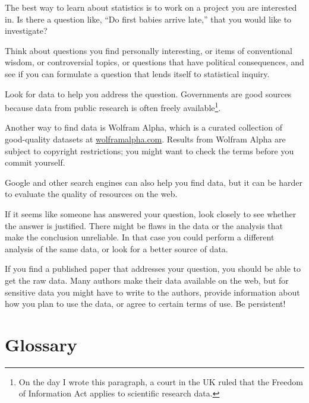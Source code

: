 \documentclass[12pt]{book}
\begin{document}
\begin{exercise}
The best way to learn about statistics is to work on a project you are
interested in.  Is there a question like, ``Do first babies arrive
late,'' that you would like to investigate?

Think about questions you find personally interesting, or items of
conventional wisdom, or controversial topics, or questions that have
political consequences, and see if you can formulate a question that
lends itself to statistical inquiry.

Look for data to help you address the question.  Governments are good
sources because data from public research is often freely
available\footnote{On the day I wrote this paragraph, a court in the
  UK ruled that the Freedom of Information Act applies to scientific
  research data.}.

Another way to find data is Wolfram Alpha, which is a curated
collection of good-quality datasets at \url{wolframalpha.com}.
Results from Wolfram Alpha are subject to copyright
restrictions; you might want to check the terms before you commit
yourself.

Google and other search engines can also help you find data, but it
can be harder to evaluate the quality of resources on the web.

If it seems like someone has answered your question, look closely to
see whether the answer is justified.  There might be flaws in the data
or the analysis that make the conclusion unreliable.  In that case you
could perform a different analysis of the same data, or look for a
better source of data.

If you find a published paper that addresses your question, you
should be able to get the raw data.  Many authors make their data
available on the web, but for sensitive data you might have to
write to the authors, provide information about how you plan to use
the data, or agree to certain terms of use.  Be persistent!

\end{exercise}


\section{Glossary}
\end{document}
